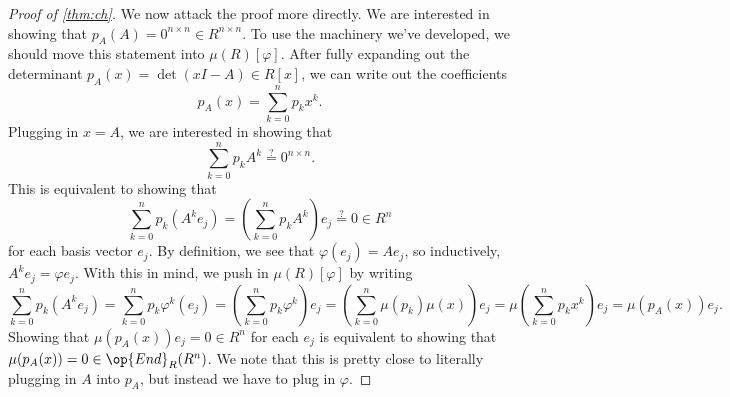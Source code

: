 \begin{proof}[Proof of \autoref{thm:ch}]
	We now attack the proof more directly. We are interested in showing that $p_A(A)=0^{n\times n}\in R^{n\times n}$. To use the machinery we've developed, we should move this statement into $\mu(R)[\varphi]$. After fully expanding out the determinant $p_A(x)=\det(xI-A)\in R[x]$, we can write out the coefficients
	\[p_A(x)=\sum_{k=0}^np_kx^k.\]
	Plugging in $x=A$, we are interested in showing that
	\[\sum_{k=0}^np_kA^k\stackrel?=0^{n\times n}.\]
	This is equivalent to showing that
	\[\sum_{k=0}^np_k\left(A^ke_j\right)=\left(\sum_{k=0}^np_kA^k\right)e_j\stackrel?=0\in R^n\]
	for each basis vector $e_j$. By definition, we see that $\varphi(e_j)=Ae_j$, so inductively, $A^ke_j=\varphi e_j$. With this in mind, we push in $\mu(R)[\varphi]$ by writing
	\[\sum_{k=0}^np_k\left(A^ke_j\right)=\sum_{k=0}^np_k\varphi^k(e_j)=\left(\sum_{k=0}^np_k\varphi^k\right)e_j=\left(\sum_{k=0}^n\mu(p_k)\mu(x)\right)e_j=\mu\left(\sum_{k=0}^np_kx^k\right)e_j=\mu(p_A(x))e_j.\]
	Showing that $\mu(p_A(x))e_j=0\in R^n$ for each $e_j$ is equivalent to showing that $\mu(p_A(x))=0\in\op{End}_R(R^n)$. We note that this is pretty close to literally plugging in $A$ into $p_A$, but instead we have to plug in $\varphi$.


\end{proof}
